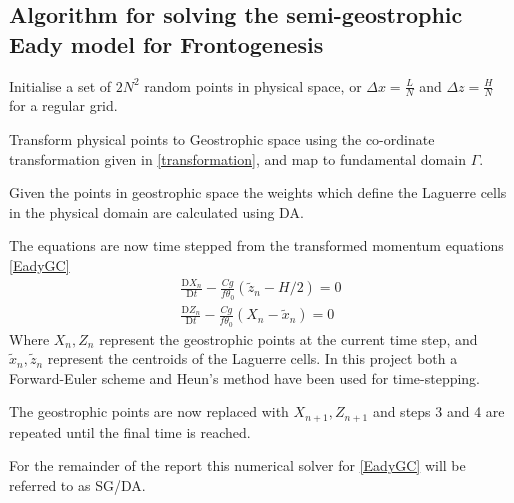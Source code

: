 \subsection{Algorithm for solving the semi-geostrophic Eady model for Frontogenesis \label{Algorithm}}
\begin{description}
	\setlength{\parskip}{0pt}
	\setlength{\itemsep}{0pt}
	\item[Step 1] Initialise a set of $2N^2$ random points in physical space, or $\Delta x = \frac{L}{N}$ and $\Delta z = \frac{H}{N}$ for a regular grid. 
	\item[Step 2] Transform physical points to Geostrophic space using the co-ordinate transformation given in \ref{transformation}, and map to fundamental domain $\Gamma$.
	\item[Step 3] Given the points in geostrophic space the weights which define the Laguerre cells in the physical domain are calculated using DA.
	\item[Step 4] The equations are now time stepped from the transformed momentum equations \ref{EadyGC} 
	\begin{equation*}
		\begin{aligned}
			\frac{\mathrm{D}X_{n}}{\mathrm{D}t} -\frac{Cg}{f\theta _0}\left(\tilde{z}_n-H/2\right) = 0 \\
			\frac{\mathrm{D}Z_{n}}{\mathrm{D}t} - \frac{Cg}{f\theta_0}\left(X_n - \tilde{x}_n\right) = 0
		\end{aligned}
	\end{equation*}
	Where $X_n, Z_n$ represent the geostrophic points at the current time step, and $\tilde{x}_n,\tilde{z}_n$ represent the centroids of the Laguerre cells. In this project both a Forward-Euler scheme and Heun's method have been used for time-stepping.
	\item[Step 5] The geostrophic points are now replaced with $X_{n+1}, Z_{n+1}$ and steps 3 and 4 are repeated until the final time is reached.
\end{description}
For the remainder of the report this numerical solver for \ref{EadyGC} will be referred to as SG/DA.
